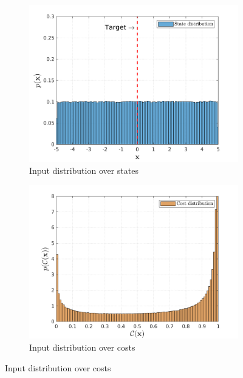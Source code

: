 \begin{figure}[htp!]    
  \begin{subfigure}[b]{0.49\linewidth}
    \centering
    \includegraphics[height=0.25\textheight,width=1\textwidth]{Chapter3/Figures/trans_traj_hist_1.png} 
    \caption{Input distribution over states} 
    \label{Fig:Re-hist-traj-1} 
  \end{subfigure} 
  \begin{subfigure}[b]{0.49\linewidth}
    \centering
    \includegraphics[height=0.25\textheight,width=1\textwidth]{Chapter3/Figures/trans_cost_hist_1.png} 
    \caption{Input distribution over costs} 
    \label{Fig:Re-hist-cost-1} 
  \end{subfigure} 


\end{figure}
